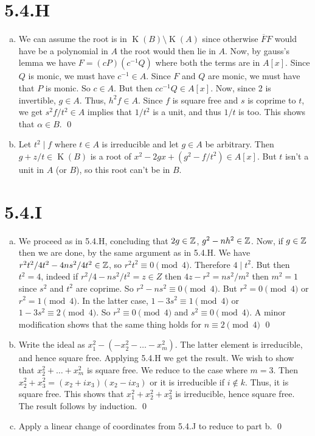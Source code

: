 \documentclass{article}
\begin{document}
\section{5.4.H}
\begin{enumerate}[a.]
    \item We can assume the root is in $\operatorname{K}(B) \setminus \operatorname{K}(A)$ since otherwise
          $\overline{F}F$ would have be a polynomial in $A$ the
          root would then lie in $A$. Now, by gauss's lemma we have
          $F=(cP)(c^{-1}Q)$ where both the terms are in $A[x]$. Since
          $Q$ is monic, we must have $c^{-1} \in A$. Since
          $F$ and $Q$ are monic, we must have that
          $P$ is monic. So $c \in A$. But then
          $cc^{-1}Q \in A[x]$. Now, since 2 is invertible, $g\in A$.
          Thus, $h^2f \in A$. Since $f$ is square free and
          $s$ is coprime to $t$, we get
          $s^2f/t^2 \in A$ implies that $1/t^2$ is a unit, and thus
          $1/t$ is too. This shows that $\alpha \in B$. \qed
    \item Let $t^2 \mid f$ where $t \in A$ is irreducible and let
          $g \in A$ be arbitrary. Then $g+z/t \in \operatorname{K}(B)$ is a root of
          $x^2-2gx+(g^2-f/t^2) \in A[x]$. But $t$ isn't a unit in
          $A$ (or $B$), so this root can't be in
          $B$.
\end{enumerate}

\section{5.4.I}
\begin{enumerate}[a.]
    \item We proceed as in 5.4.H, concluding that $2g \in \mathbb{Z}$,
          $g^2-nh^2 \in \mathbb{Z}$. Now, if $g \in \mathbb{Z}$ then we are done, by the
          same argument as in 5.4.H. We have $r^2t^2/4t^2-4ns^2/4t^2 \in \mathbb{Z}$, so
          $r^2t^2 \equiv 0 \pmod{4}$. Therefore $4 \mid t^2$. But then
          $t^2 = 4$, indeed if $r^2/4-ns^2/t^2=z \in Z$ then
          $4z-r^2=ns^2/m^2$ then $m^2=1$ since $s^2$
          and $t^2$ are coprime. So $r^2-ns^2 \equiv 0 \pmod{4}$. But
          $r^2 = 0 \pmod{4}$ or $r^2 = 1 \pmod{4}$. In the latter case,
          $1-3s^2 \equiv 1 \pmod{4}$ or $1-3s^2 \equiv 2 \pmod{4}$. So $r^2 \equiv 0 \pmod{4}$ and
          $s^2 \equiv 0 \pmod{4}$. A minor modification shows that the same thing holds
          for $n \equiv 2 \pmod{4}$ \qed
    \item Write the ideal as $x_1^2-(-x_2^2-\dots-x_m^2)$. The latter element is irreducible,
          and hence square free. Applying 5.4.H we get the result. We wish to show that
          $x_2^2+\dots+x_m^2$ is square free. We reduce to the case where
          $m=3$. Then $x_2^2+x_3^2=(x_2+ix_3)(x_2-ix_3)$ or it is irreducible if
          $i \notin k$. Thus, it is square free. This shows that
          $x_1^2+x_2^2+x_3^2$ is irreducible, hence square free. The result follows by
          induction. \qed
    \item Apply a linear change of coordinates from 5.4.J to reduce to part b. \qed
\end{enumerate}
\end{document}
